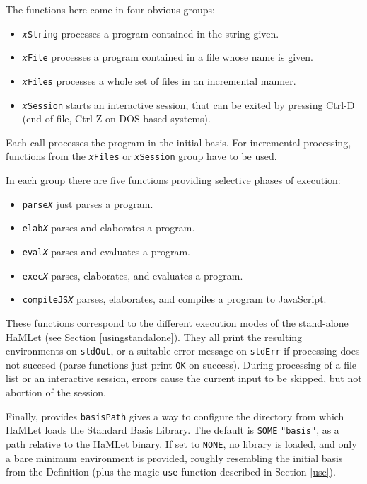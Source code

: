 \documentclass[twoside,titlepage]{article}
\begin{document}
The functions here come in four obvious groups:

\begin{itemize}[nolistsep]
\item {\tt{\sl x}String} processes a program contained in the string given.
\item {\tt{\sl x}File} processes a program contained in a file whose name is given.
\item {\tt{\sl x}Files} processes a whole set of files in an incremental manner.
\item {\tt{\sl x}Session} starts an interactive session, that can be exited by pressing Ctrl-D (end of file, Ctrl-Z on DOS-based systems).
\end{itemize}

Each call processes the program in the initial basis. For incremental processing, functions from the {\tt{\sl x}Files} or {\tt{\sl x}Session} group have to be used.

In each group there are five functions providing selective phases of execution:

\begin{itemize}[nolistsep]
\item {\tt parse{\sl{X}}} just parses a program.
\item {\tt elab{\sl{X}}} parses and elaborates a program.
\item {\tt eval{\sl{X}}} parses and evaluates a program.
\item {\tt exec{\sl{X}}} parses, elaborates, and evaluates a program.
\item {\tt compileJS{\sl{X}}} parses, elaborates, and compiles a program to JavaScript.
\end{itemize}

These functions correspond to the different execution modes of the stand-alone HaMLet (see Section \ref{usingstandalone}). They all print the resulting environments on {\tt stdOut}, or a suitable error message on {\tt stdErr} if processing does not succeed (parse functions just print {\tt OK} on success). During processing of a file list or an interactive session, errors cause the current input to be skipped, but not abortion of the session.

Finally, provides {\tt basisPath} gives a way to configure the directory from which HaMLet loads the Standard Basis Library. The default is {\tt SOME} {\tt "basis"}, as a path relative to the HaMLet binary. If set to {\tt NONE}, no library is loaded, and only a bare minimum environment is provided, roughly resembling the initial basis from the Definition (plus the magic {\tt use} function described in Section \ref{use}).
\end{document}
